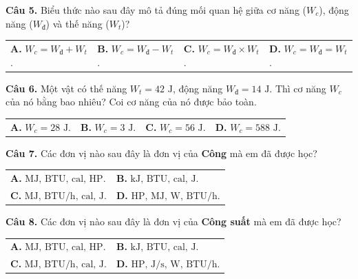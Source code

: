 \documentclass{article}
\begin{document}
\fontsize{26}{34}\selectfont
\textbf{Câu 5.} Biểu thức nào sau đây mô tả đúng mối quan hệ giữa cơ năng ($W_c$), động năng ($W_đ$) và thế năng ($W_t$)?
\vspace{6pt}

\begin{tabularx}{\linewidth}{@{}X X X X@{}}
\textbf{A.} $W_c = W_đ + W_t$. & \textbf{B.} $W_c = W_đ - W_t$. & \textbf{C.} $W_c = W_đ \times W_t$. & \textbf{D.} $W_c = W_đ = W_t$.
\end{tabularx}

\vspace*{\fill}

\textbf{Câu 6.} Một vật có thế năng $W_t = 42\text{ J}$, động năng $W_đ = 14\text{ J}$. Thì cơ năng $W_c$ của nó bằng bao nhiêu? Coi cơ năng của nó được bảo toàn.
\vspace{6pt}

\begin{tabularx}{\linewidth}{@{}X X X X@{}}
\textbf{A.} $W_c = 28\text{ J}$. & \textbf{B.} $W_c = 3\text{ J}$. & \textbf{C.} $W_c = 56\text{ J}$. & \textbf{D.} $W_c = 588\text{ J}$.
\end{tabularx}
\vspace*{\fill}
\newpage

\fontsize{26}{34}\selectfont
\textbf{Câu 7.} Các đơn vị nào sau đây là đơn vị của \textbf{Công} mà em đã được học?
\vspace{6pt}

\begin{tabularx}{\linewidth}{@{}X X@{}}
\textbf{A.} $\text{MJ, BTU, cal, HP}$. & \textbf{B.} $\text{kJ, BTU, cal, J}$.\\[8pt]
\textbf{C.} $\text{MJ, BTU/h, cal, J}$. & \textbf{D.} $\text{HP, MJ, W, BTU/h}$.
\end{tabularx}

\vspace*{\fill}

\textbf{Câu 8.} Các đơn vị nào sau đây là đơn vị của \textbf{Công suất} mà em đã được học?
\vspace{6pt}

\begin{tabularx}{\linewidth}{@{}X X@{}}
\textbf{A.} $\text{MJ, BTU, cal, HP}$. & \textbf{B.} $\text{kJ, BTU, cal, J}$.\\[8pt]
\textbf{C.} $\text{MJ, BTU/h, cal, J}$. & \textbf{D.} $\text{HP, J/s, W, BTU/h}$.
\end{tabularx}
\vspace*{\fill}
\newpage
\end{document}

